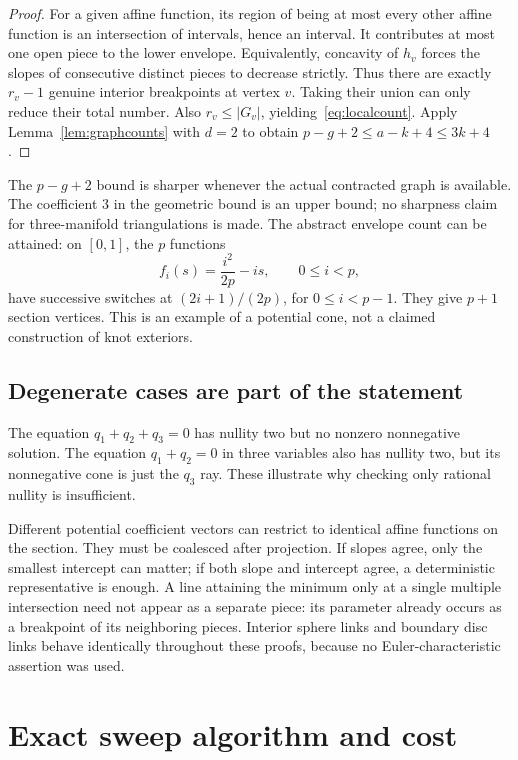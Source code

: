\documentclass[11pt]{article}
\theoremstyle{definition}
\theoremstyle{remark}
\begin{document}
\begin{proof}
For a given affine function, its region of being at most every other affine
function is an intersection of intervals, hence an interval. It contributes
at most one open piece to the lower envelope. Equivalently, concavity of
$h_v$ forces the slopes of consecutive distinct pieces to decrease strictly.
Thus there are exactly $r_v-1$ genuine interior breakpoints at vertex $v$.
Taking their union can only reduce their total number. Also
$r_v\le |G_v|$, yielding~\eqref{eq:localcount}. Apply
Lemma~\ref{lem:graphcounts} with $d=2$ to obtain
$p-g+2\le a-k+4\le3k+4$.
\end{proof}

The $p-g+2$ bound is sharper whenever the actual contracted graph is available.
The coefficient $3$ in the geometric bound is an upper bound; no sharpness
claim for three-manifold triangulations is made. The abstract envelope count
can be attained: on $[0,1]$, the $p$ functions
\begin{equation}
 f_i(s)=\frac{i^2}{2p}-is,\qquad 0\le i<p,
 \label{eq:abstractsharp}
\end{equation}
have successive switches at $(2i+1)/(2p)$, for $0\le i<p-1$.
They give $p+1$ section vertices. This is an example of a potential cone,
not a claimed construction of knot exteriors.

\subsection{Degenerate cases are part of the statement}

The equation $q_1+q_2+q_3=0$ has nullity two but no nonzero nonnegative
solution. The equation $q_1+q_2=0$ in three variables also has nullity two,
but its nonnegative cone is just the $q_3$ ray. These illustrate why checking
only rational nullity is insufficient.

Different potential coefficient vectors can restrict to identical affine
functions on the section. They must be coalesced after projection. If slopes
agree, only the smallest intercept can matter; if both slope and intercept
agree, a deterministic representative is enough. A line attaining the
minimum only at a single multiple intersection need not appear as a separate
piece: its parameter already occurs as a breakpoint of its neighboring
pieces. Interior sphere links and boundary disc links behave identically
throughout these proofs, because no Euler-characteristic assertion was used.

\section{Exact sweep algorithm and cost}
\label{sec:algorithm}
\end{document}
